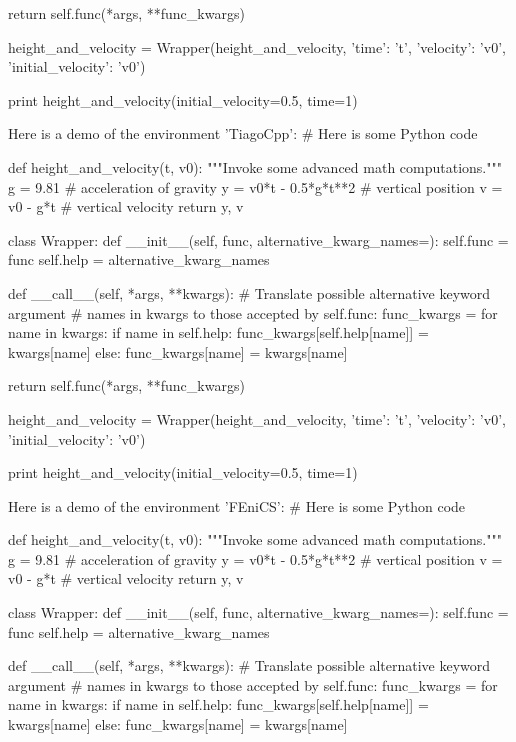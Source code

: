         return self.func(*args, **func_kwargs)

height_and_velocity = Wrapper(height_and_velocity,
                              {'time': 't',
                               'velocity': 'v0',
                               'initial_velocity': 'v0'})

print height_and_velocity(initial_velocity=0.5, time=1)


\noindent
Here is a demo of the environment 'TiagoCpp':
# Here is some Python code

def height_and_velocity(t, v0):
    """Invoke some advanced math computations."""
    g = 9.81                  # acceleration of gravity
    y = v0*t - 0.5*g*t**2     # vertical position
    v = v0 - g*t              # vertical velocity
    return y, v

class Wrapper:
    def __init__(self, func, alternative_kwarg_names={}):
        self.func = func
        self.help = alternative_kwarg_names

    def __call__(self, *args, **kwargs):
        # Translate possible alternative keyword argument
        # names in kwargs to those accepted by self.func:
        func_kwargs = {}
        for name in kwargs:
            if name in self.help:
                func_kwargs[self.help[name]] = kwargs[name]
            else:
                func_kwargs[name] = kwargs[name]

        return self.func(*args, **func_kwargs)

height_and_velocity = Wrapper(height_and_velocity,
                              {'time': 't',
                               'velocity': 'v0',
                               'initial_velocity': 'v0'})

print height_and_velocity(initial_velocity=0.5, time=1)


\noindent
Here is a demo of the environment 'FEniCS':
# Here is some Python code

def height_and_velocity(t, v0):
    """Invoke some advanced math computations."""
    g = 9.81                  # acceleration of gravity
    y = v0*t - 0.5*g*t**2     # vertical position
    v = v0 - g*t              # vertical velocity
    return y, v

class Wrapper:
    def __init__(self, func, alternative_kwarg_names={}):
        self.func = func
        self.help = alternative_kwarg_names

    def __call__(self, *args, **kwargs):
        # Translate possible alternative keyword argument
        # names in kwargs to those accepted by self.func:
        func_kwargs = {}
        for name in kwargs:
            if name in self.help:
                func_kwargs[self.help[name]] = kwargs[name]
            else:
                func_kwargs[name] = kwargs[name]

